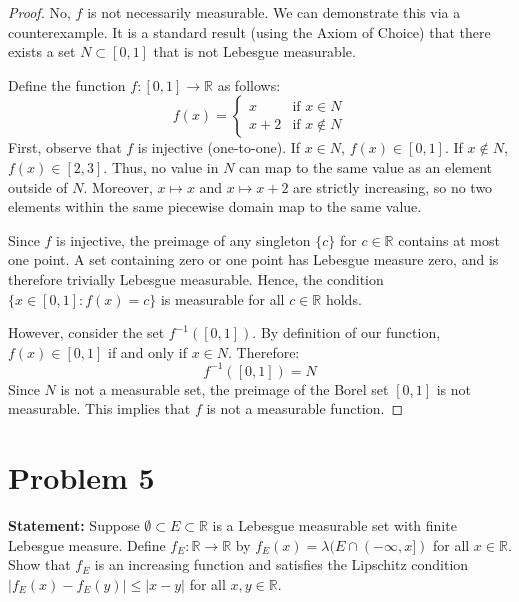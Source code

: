\documentclass[12pt]{article}
\begin{document}
\begin{proof}
No, $f$ is not necessarily measurable. We can demonstrate this via a counterexample. 
It is a standard result (using the Axiom of Choice) that there exists a set $N \subset [0,1]$ that is not Lebesgue measurable. 

Define the function $f: [0,1] \rightarrow \mathbb{R}$ as follows:
\[
f(x) = \begin{cases} 
x & \text{if } x \in N \\
x + 2 & \text{if } x \notin N 
\end{cases}
\]
First, observe that $f$ is injective (one-to-one). If $x \in N$, $f(x) \in [0,1]$. If $x \notin N$, $f(x) \in [2,3]$. Thus, no value in $N$ can map to the same value as an element outside of $N$. Moreover, $x \mapsto x$ and $x \mapsto x+2$ are strictly increasing, so no two elements within the same piecewise domain map to the same value.

Since $f$ is injective, the preimage of any singleton $\{c\}$ for $c \in \mathbb{R}$ contains at most one point. A set containing zero or one point has Lebesgue measure zero, and is therefore trivially Lebesgue measurable. Hence, the condition $\{x \in [0,1] : f(x) = c\}$ is measurable for all $c \in \mathbb{R}$ holds.

However, consider the set $f^{-1}([0,1])$. By definition of our function, $f(x) \in [0,1]$ if and only if $x \in N$. Therefore:
\[
f^{-1}([0,1]) = N
\]
Since $N$ is not a measurable set, the preimage of the Borel set $[0,1]$ is not measurable. This implies that $f$ is not a measurable function.
\end{proof}

\section*{Problem 5}
\textbf{Statement:} Suppose $\emptyset\subset E\subset\mathbb{R}$ is a Lebesgue measurable set with finite Lebesgue measure. Define $f_{E}:\mathbb{R}\rightarrow\mathbb{R}$ by $f_E(x)=\lambda(E\cap(-\infty,x])$ for all $x\in\mathbb{R}$. Show that $f_E$ is an increasing function and satisfies the Lipschitz condition $|f_E(x)-f_E(y)|\le|x-y|$ for all $x, y\in\mathbb{R}$.
\end{document}
